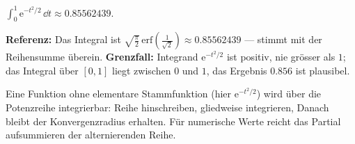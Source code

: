 \begin{ergebnis}
$\displaystyle\int_0^1 \mathrm e^{-t^2/2}\,\dd t \approx 0.85562439 .$
\end{ergebnis}

\begin{kontrolle}
\textbf{Referenz:} Das Integral ist $\sqrt{\tfrac\pi2}\,\mathrm{erf}(\tfrac1{\sqrt2})
\approx0.85562439$ — stimmt mit der Reihensumme überein.
\textbf{Grenzfall:} Integrand $\mathrm e^{-t^2/2}$ ist positiv, nie grösser als
$1$; das Integral über $[0,1]$ liegt zwischen $0$ und $1$, das Ergebnis
$0.856$ ist plausibel.
\end{kontrolle}

\begin{merksatz}
Eine Funktion ohne elementare Stammfunktion (hier $\mathrm e^{-t^2/2}$) wird
über die Potenzreihe integrierbar: Reihe hinschreiben, gliedweise integrieren,
Danach bleibt der Konvergenzradius erhalten. Für numerische Werte reicht das
Partial aufsummieren der alternierenden Reihe.
\end{merksatz}
